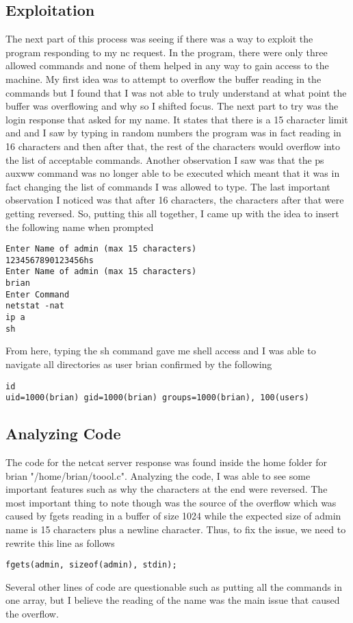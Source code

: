 \documentclass[notitlepage]{article}
\begin{document}
    \subsection{Exploitation}
        The next part of this process was seeing if there was a way to exploit the program responding to my nc request. In the program, there
        were only three allowed commands and none of them helped in any way to gain access to the machine. My first idea was to attempt to overflow the
        buffer reading in the commands but I found that I was not able to truly understand at what point the buffer was overflowing and why so I shifted focus.
        The next part to try was the login response that asked for my name. It states that there is a 15 character limit and and I saw by typing in random numbers the program
        was in fact reading in 16 characters and then after that, the rest of the characters would overflow into the list of acceptable commands. Another observation I saw was
        that the ps auxww command was no longer able to be executed which meant that it was in fact changing the list of commands I was allowed to type. The last important observation
        I noticed was that after 16 characters, the characters after that were getting reversed. So, putting this all together, I came up with the idea to insert the following name when
        prompted
    \begin{verbatim}
Enter Name of admin (max 15 characters)
1234567890123456hs
Enter Name of admin (max 15 characters)
brian
Enter Command
netstat -nat
ip a
sh
    \end{verbatim}
    From here, typing the sh command gave me shell access and I was able to navigate all directories as user brian confirmed by the following
    \begin{verbatim}
id
uid=1000(brian) gid=1000(brian) groups=1000(brian), 100(users)
    \end{verbatim}

    \subsection{Analyzing Code}
    The code for the netcat server response was found inside the home folder for brian "/home/brian/toool.c". Analyzing the code, I was able to see 
    some important features such as why the characters at the end were reversed. The most important thing to note though was the source of the overflow which was
    caused by fgets reading in a buffer of size 1024 while the expected size of admin name is 15 characters plus a newline character. Thus, to fix the issue, we need 
    to rewrite this line as follows
\begin{verbatim}
fgets(admin, sizeof(admin), stdin);
    \end{verbatim}
    Several other lines of code are questionable such as putting all the commands in one array, but I believe the reading of the name was the main issue that caused the overflow.
\end{document}
